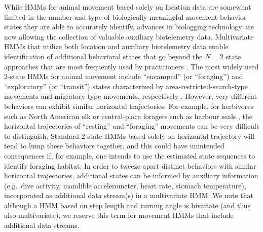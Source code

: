 \documentclass[12pt]{article}\usepackage[]{graphicx}\usepackage[]{color}
\begin{document}
While HMMs for animal movement based solely on location data are somewhat limited in the number and type of biologically-meaningful movement behavior states they are able to accurately identify, advances in biologging technology are now allowing the collection of valuable auxiliary biotelemetry data. %
Multivariate HMMs that utilize both location and auxiliary biotelemetry data enable identification of additional behavioral states that go beyond the $N=2$ state approaches that are most frequently used by practitioners \citep[e.g.][]{McClintockEtAl2013c,DeRuiterEtAl2017,McClintockEtAl2017}. The most widely used 2-state HMMs for animal movement include ``encamped'' (or ``foraging'') and ``exploratory'' (or ``transit'') states characterized by area-restricted-search-type movements and migratory-type movements, respectively \citep{MoralesEtAl2004,JonsenEtAl2005}.  However, very different behaviors can exhibit similar horizontal trajectories.  For example, for herbivores such as North American elk \citep{MoralesEtAl2004} or central-place foragers such as harbour seals \citep{McClintockEtAl2013c}, the horizontal trajectories of ``resting'' and ``foraging'' movements can be very difficult to distinguish. Standard 2-state HMMs based solely on horizontal trajectory will tend to lump these behaviors together, and this could have unintended consequences if, for example, one intends to use the estimated state sequences to identify foraging habitat. In order to tweeze apart distinct behaviors with similar horizontal trajectories, additional states can be informed by auxiliary information (e.g.\ dive activity, mandible accelerometer, heart rate, stomach temperature), incorporated as additional data stream(s) in a multivariate HMM. We note that although a HMM based on step length and turning angle is bivariate (and thus also multivariate), we reserve this term for movement HMMs that include additional data streams.
\end{document}
